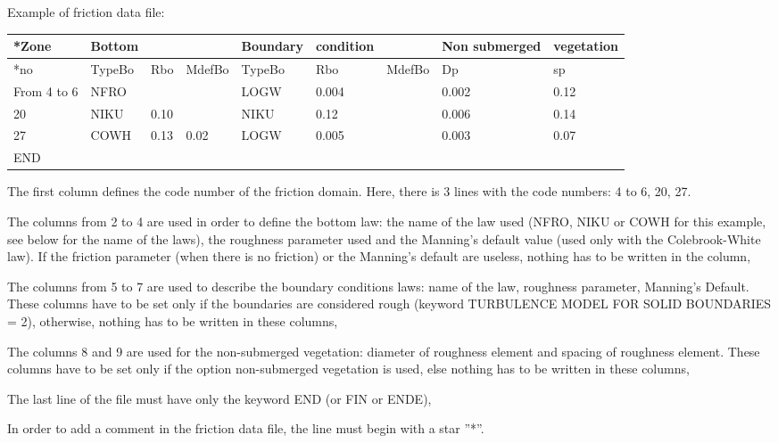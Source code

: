  Example of friction data file:



\begin{tabular}{|p{0.3in}|p{0.3in}|p{0.3in}|p{0.4in}|p{0.4in}|p{0.5in}|p{0.5in}|p{0.7in}|p{0.5in}|} \hline
*Zone & Bottom &  &  & Boundary & condition &  & Non submerged & vegetation \\ \hline
*no & TypeBo & Rbo & MdefBo & TypeBo & Rbo & MdefBo & Dp & sp \\ \hline
From 4 to 6 & NFRO &  &  & LOGW & 0.004 &  & 0.002 & 0.12 \\ \hline
20 & NIKU & 0.10 &  & NIKU & 0.12 &  & 0.006 & 0.14 \\ \hline
27 & COWH & 0.13 & 0.02 & LOGW & 0.005 &  & 0.003 & 0.07 \\ \hline
END &  &  &  &  &  &  &  &  \\ \hline
\end{tabular}



 The first column defines the code number of the friction domain. Here, there is 3 lines with the code numbers: 4 to 6, 20, 27.

 The columns from 2 to 4 are used in order to define the bottom law: the name of the law used (NFRO, NIKU or COWH for this example, see below for the name of the laws), the roughness parameter used and the Manning's default value (used only with the Colebrook-White law). If the friction parameter (when there is no friction) or the Manning's default are useless, nothing has to be written in the column,

 The columns from 5 to 7 are used to describe the boundary conditions laws: name of the law, roughness parameter, Manning's Default. These columns have to be set only if the boundaries are considered rough (keyword TURBULENCE MODEL FOR SOLID BOUNDARIES = 2), otherwise, nothing has to be written in these columns,

 The columns 8 and 9 are used for the non-submerged vegetation: diameter of roughness element and spacing of roughness element. These columns have to be set only if the option non-submerged vegetation is used, else nothing has to be written in these columns,

 The last line of the file must have only the keyword END (or FIN or ENDE),

 In order to add a comment in the friction data file, the line must begin with a star ''*''.





